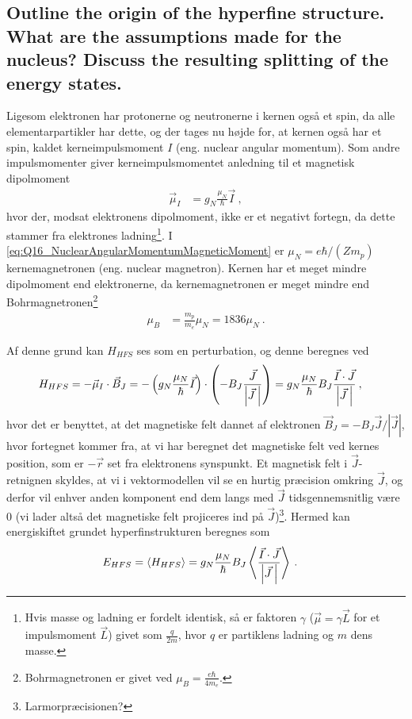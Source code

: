 \subsection{Outline the origin of the hyperfine structure. What are the assumptions made for the nucleus? Discuss the resulting splitting of the energy states.}


Ligesom elektronen har protonerne og neutronerne i kernen også et spin, da alle elementarpartikler har dette, og der tages nu højde for, at kernen også har et spin, kaldet \textsf{kerneimpulsmoment} $I$ (eng. nuclear angular momentum). Som andre impulsmomenter giver kerneimpulsmomentet anledning til et magnetisk dipolmoment
\begin{align} \label{eq:Q16_NuclearAngularMomentumMagneticMoment}
	\vec{\mu}_I &= g_N \frac{\mu_N}{\hbar} \vec{I} \: ,
\end{align}
hvor der, modsat elektronens dipolmoment, ikke er et negativt fortegn, da dette stammer fra elektrones ladning\footnote{Hvis masse og ladning er fordelt identisk, så er faktoren $\gamma$ ($\vec{\mu} = \gamma \vec{L}$ for et impulsmoment $\vec{L}$) givet som $\frac{q}{2m}$, hvor $q$ er partiklens ladning og $m$ dens masse.}. I \cref{eq:Q16_NuclearAngularMomentumMagneticMoment} er $\mu_N = e\hbar/(Zm_p)$ kernemagnetronen (eng. nuclear magnetron). Kernen har et meget mindre dipolmoment end elektronerne, da kernemagnetronen er meget mindre end Bohrmagnetronen\footnote{Bohrmagnetronen er givet ved $\mu_B = \frac{e\hbar}{4m_e}$.}
\begin{align}
	\mu_B &= \frac{m_p}{m_e}\mu_N = 1836 \mu_N \: .
\end{align}

Af denne grund kan $H_{HFS}$ ses som en perturbation, og denne beregnes ved
\begin{align} \label{eq:Q16_HyperFineStructureHamiltonStart}
	H_{HFS} &= -\vec{\mu}_I \cdot \vec{B}_J
	= -\left(g_N \frac{\mu_N}{\hbar} \vec{I}\right) \cdot \left(-B_J \frac{\vec{J}}{\abs{\vec{J} \: }}\right)
	= g_N \frac{\mu_N}{\hbar} B_J \frac{\vec{I} \cdot \vec{J}}{\abs{\vec{J} \: }} \: ,
\end{align}
hvor det er benyttet, at det magnetiske felt dannet af elektronen $\vec{B}_J = - B_J \vec{J}/|\vec{J}|$, hvor fortegnet kommer fra, at vi har beregnet det magnetiske felt ved kernes position, som er $-\vec{r}$ set fra elektronens synspunkt. Et magnetisk felt i $\vec{J}$-retnignen skyldes, at vi i vektormodellen vil se en hurtig præcision omkring $\vec{J}$, og derfor vil enhver anden komponent end dem langs med $\vec{J}$ tidsgennemsnitlig være $0$ (vi lader altså det magnetiske felt projiceres ind på $\vec{J}$)\footnote{Larmorpræcisionen?}. Hermed kan energiskiftet grundet hyperfinstrukturen beregnes som
\begin{align} \label{eq:Q16_HyperFineStructureEnergyChangeStart}
    E_{HFS} &= \Braket{H_{HFS}} = g_N \frac{\mu_N}{\hbar} B_J \Braket{\frac{\vec{I} \cdot \vec{J}}{\abs{\vec{J} \: }}} \: .
\end{align}

